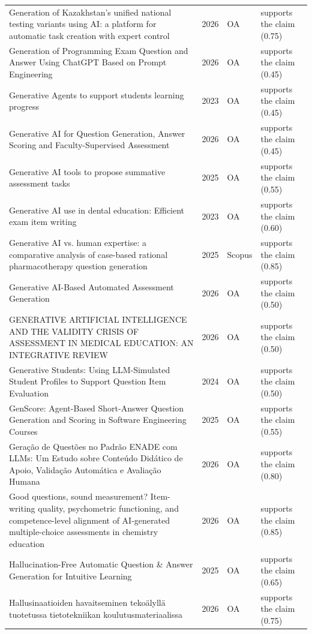 \begin{longtable}{@{}%
  >{\raggedright\arraybackslash}p{}c%
  >{\raggedright\arraybackslash}p{}%
  >{\raggedright\arraybackslash}p{}@{}}
Generation of Kazakhstan's unified national testing variants using AI: a platform for automatic task creation with expert control & 2026 & OA & supports the claim (0.75) \\
Generation of Programming Exam Question and Answer Using ChatGPT Based on Prompt Engineering & 2026 & OA & supports the claim (0.45) \\
Generative Agents to support students learning progress & 2023 & OA & supports the claim (0.45) \\
Generative AI for Question Generation, Answer Scoring and Faculty-Supervised Assessment & 2026 & OA & supports the claim (0.45) \\
Generative AI tools to propose summative assessment tasks & 2025 & OA & supports the claim (0.55) \\
Generative AI use in dental education: Efficient exam item writing & 2023 & OA & supports the claim (0.60) \\
Generative AI vs. human expertise: a comparative analysis of case-based rational pharmacotherapy question generation & 2025 & Scopus & supports the claim (0.85) \\
Generative AI-Based Automated Assessment Generation & 2026 & OA & supports the claim (0.50) \\
GENERATIVE ARTIFICIAL INTELLIGENCE AND THE VALIDITY CRISIS OF ASSESSMENT IN MEDICAL EDUCATION: AN INTEGRATIVE REVIEW & 2026 & OA & supports the claim (0.50) \\
Generative Students: Using LLM-Simulated Student Profiles to Support Question Item Evaluation & 2024 & OA & supports the claim (0.50) \\
GenScore: Agent-Based Short-Answer Question Generation and Scoring in Software Engineering Courses & 2025 & OA & supports the claim (0.55) \\
Geração de Questões no Padrão ENADE com LLMs: Um Estudo sobre Conteúdo Didático de Apoio, Validação Automática e Avaliação Humana & 2026 & OA & supports the claim (0.80) \\
Good questions, sound measurement? Item-writing quality, psychometric functioning, and competence-level alignment of AI-generated multiple-choice assessments in chemistry education & 2026 & OA & supports the claim (0.85) \\
Hallucination-Free Automatic Question \& Answer Generation for Intuitive Learning & 2025 & OA & supports the claim (0.65) \\
Hallusinaatioiden havaitseminen tekoälyllä tuotetussa tietotekniikan koulutusmateriaalissa & 2026 & OA & supports the claim (0.75) \\

\end{longtable}
